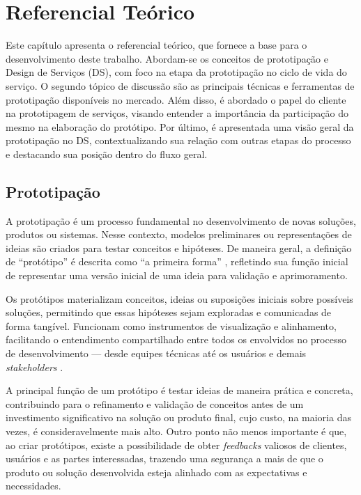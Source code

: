 \chapter[Referencial teórico]{Referencial Teórico}

Este capítulo apresenta o referencial teórico, que fornece a base para o desenvolvimento deste trabalho. Abordam-se os conceitos de prototipação e Design de Serviços (DS), com foco na etapa da prototipação no ciclo de vida do serviço. O segundo tópico de discussão são as principais técnicas e ferramentas de prototipação disponíveis no mercado. Além disso, é abordado o papel do cliente na prototipagem de serviços, visando entender a importância da participação do mesmo na elaboração do protótipo. Por último, é apresentada uma visão geral da prototipação no DS, contextualizando sua relação com outras etapas do processo e destacando sua posição dentro do fluxo geral.

\section{Prototipação}

A prototipação é um processo fundamental no desenvolvimento de novas soluções, produtos ou sistemas. Nesse contexto, modelos preliminares ou representações de ideias são criados para testar conceitos e hipóteses. De maneira geral, a definição de ``protótipo'' é descrita como ``a primeira forma'' \cite{Blomkvist2011existing}, refletindo sua função inicial de representar uma versão inicial de uma ideia para validação e aprimoramento.

Os protótipos materializam conceitos, ideias ou suposições iniciais sobre possíveis soluções, permitindo que essas hipóteses sejam exploradas e comunicadas de forma tangível. Funcionam como instrumentos de visualização e alinhamento, facilitando o entendimento compartilhado entre todos os envolvidos no processo de desenvolvimento — desde equipes técnicas até os usuários e demais \textit{stakeholders} \cite{Blomkvist2014}.

A principal função de um protótipo é testar ideias de maneira prática e concreta, contribuindo para o refinamento e validação de conceitos antes de um investimento significativo na solução ou produto final, cujo custo, na maioria das vezes, é consideravelmente mais alto. Outro ponto não menos importante é que, ao criar protótipos, existe a possibilidade de obter \textit{feedbacks} valiosos de clientes, usuários e as partes interessadas, trazendo uma segurança a mais de que o produto ou solução desenvolvida esteja alinhado com as expectativas e necessidades.

